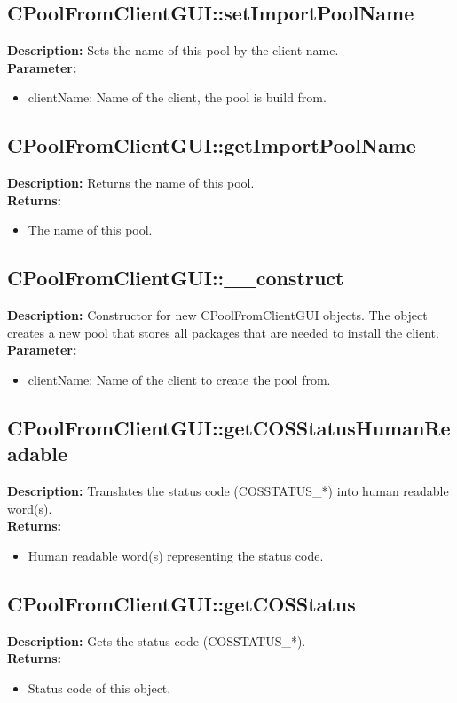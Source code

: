 \subsection{CPoolFromClientGUI::setImportPoolName}
\textbf{Description:} Sets the name of this pool by the client name.\\
\textbf{Parameter:}
\begin{itemize}
\item clientName: Name of the client, the pool is build from.
\end{itemize}

\subsection{CPoolFromClientGUI::getImportPoolName}
\textbf{Description:} Returns the name of this pool.\\
\textbf{Returns:}
\begin{itemize}
\item The name of this pool.
\end{itemize}

\subsection{CPoolFromClientGUI::\_\_construct}
\textbf{Description:} Constructor for new CPoolFromClientGUI objects. The object creates a new pool that stores all packages that are needed to install the client.\\
\textbf{Parameter:}
\begin{itemize}
\item clientName: Name of the client to create the pool from.
\end{itemize}

\subsection{CPoolFromClientGUI::getCOSStatusHumanReadable}
\textbf{Description:} Translates the status code (COSSTATUS\_*) into human readable word(s).\\
\textbf{Returns:}
\begin{itemize}
\item Human readable word(s) representing the status code.
\end{itemize}

\subsection{CPoolFromClientGUI::getCOSStatus}
\textbf{Description:} Gets the status code (COSSTATUS\_*).\\
\textbf{Returns:}
\begin{itemize}
\item Status code of this object.
\end{itemize}

